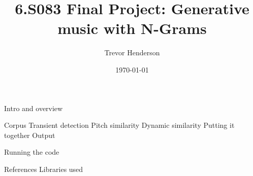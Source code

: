 \documentclass{amsart}
\theoremstyle{definition}
\begin{document}
\title{6.S083 Final Project: Generative music with N-Grams}
\author{Trevor Henderson}
\date{\today}
\maketitle

Intro and overview

Corpus
Transient detection
Pitch similarity
Dynamic similarity
Putting it together
Output

Running the code

References
Libraries used
\end{document}
